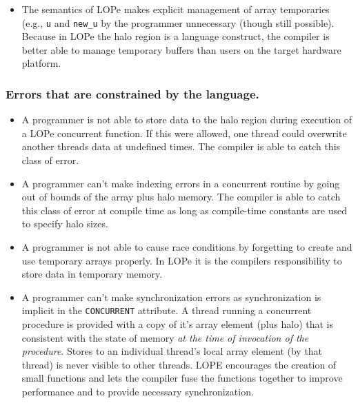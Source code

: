 \begin{itemize}
\item
The semantics of LOPe makes explicit management of array temporaries (e.g., \texttt{u} and
\texttt{new\_u} by the programmer unnecessary (though still possible).  Because in LOPe the
halo region is a language construct, the compiler is better able to manage temporary
buffers than users on the target hardware platform.

\end{itemize}

\subsubsection{Errors that are constrained by the language.}
\begin{itemize}

\item
A programmer is not able to store data to the halo region during execution of a LOPe concurrent
function.  If this were allowed, one thread could overwrite another threads data at undefined times.
The compiler is able to catch this class of error.

\item
A programmer can't make indexing errors in a concurrent routine by going out of bounds of the array
plus halo memory.  The compiler is able to catch this class of error at compile time as long as
compile-time constants are used to specify halo sizes.

\item
A programmer is not able to cause race conditions by forgetting to create and use temporary arrays
properly.  In LOPe it is the compilers responsibility to store data in temporary memory.

\item
A programmer can't make synchronization errors as synchronization is implicit in the
\texttt{CONCURRENT} attribute.  A thread running a concurrent procedure is provided with a copy of
it's array element (plus halo) that is consistent with the state of memory \emph{at the time of
  invocation of the procedure}.  Stores to an individual thread's local array element (by that
thread) is never visible to other threads.  LOPE encourages the creation of small functions and lets
the compiler fuse the functions together to improve performance and to provide necessary
synchronization.

\end{itemize}
